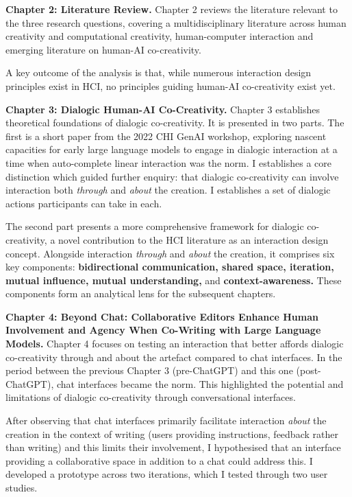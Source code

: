 \textbf{Chapter 2: Literature Review.} Chapter 2 reviews the literature relevant to the three research questions, covering a multidisciplinary literature across human creativity and computational creativity, human-computer interaction and emerging literature on human-AI co-creativity. 

 A key outcome of the analysis is that, while numerous interaction design principles exist in HCI, no principles guiding human-AI co-creativity exist yet.

\textbf{Chapter 3: Dialogic Human-AI Co-Creativity.} Chapter 3 establishes theoretical foundations of dialogic co-creativity. It is presented in two parts. The first is a short paper from the 2022 CHI GenAI workshop, exploring nascent capacities for early large language models to engage in dialogic interaction at a time when auto-complete linear interaction was the norm. I establishes a core distinction which guided further enquiry: that dialogic co-creativity can involve interaction both \textit{through} and \textit{about} the creation. I establishes a set of dialogic actions participants can take in each. 

The second part presents a more comprehensive framework for dialogic co-creativity, a novel contribution to the HCI literature as an interaction design concept. Alongside interaction \textit{through} and \textit{about} the creation, it comprises six key components: \textbf{bidirectional communication, shared space, iteration, mutual influence, mutual understanding, }and\textbf{ context-awareness.} These components form an analytical lens for the subsequent chapters.

\textbf{Chapter 4: Beyond Chat: Collaborative Editors Enhance Human Involvement and Agency When Co-Writing with Large Language Models.} Chapter 4 focuses on testing an interaction that better affords dialogic co-creativity through and about the artefact compared to chat interfaces. In the period between the previous Chapter 3 (pre-ChatGPT) and this one (post-ChatGPT), chat interfaces became the norm. This highlighted the potential and limitations of dialogic co-creativity through conversational interfaces. 

After observing that chat interfaces primarily facilitate interaction \textit{about} the creation in the context of writing (users providing instructions, feedback rather than writing) and this limits their involvement, I hypothesised that an interface providing a collaborative space in addition to a chat could address this. I developed a prototype across two iterations, which I tested through two user studies.  

